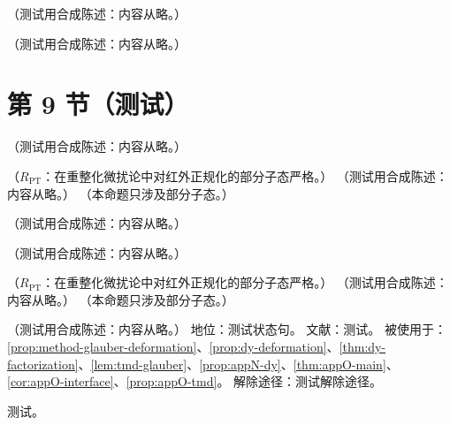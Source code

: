 \begin{remark}\label{rem:appO-weak}
（测试用合成陈述：内容从略。）
\end{remark}

\begin{remark}[H-发射端点的障碍]\label{rem:appO-h-emission}
（测试用合成陈述：内容从略。）
\end{remark}

\section{第 9 节（测试）}\label{sec:appO-main}

\begin{definition}\label{def:appO-deformation-map}
（测试用合成陈述：内容从略。）
\end{definition}

\begin{lemma}\label{lem:appO-no-crossing}
（$R_{\mathrm{PT}}$：在重整化微扰论中对红外正规化的部分子态严格。）
（测试用合成陈述：内容从略。）
（本命题只涉及部分子态。）
\end{lemma}

\begin{definition}[分级构型]\label{def:appO-graded}
（测试用合成陈述：内容从略。）
\end{definition}

\begin{definition}[形变目标与相容性]\label{def:appO-target}
（测试用合成陈述：内容从略。）
\end{definition}

\begin{proposition}\label{prop:appO-target}
（$R_{\mathrm{PT}}$：在重整化微扰论中对红外正规化的部分子态严格。）
（测试用合成陈述：内容从略。）
（本命题只涉及部分子态。）
\end{proposition}

\begin{assumption}\label{asm:appO-deformation}
（测试用合成陈述：内容从略。）
地位：测试状态句。
文献：测试。
被使用于：\cref{prop:method-glauber-deformation}、\cref{prop:dy-deformation}、\cref{thm:dy-factorization}、\cref{lem:tmd-glauber}、\cref{prop:appN-dy}、\cref{thm:appO-main}、\cref{cor:appO-interface}、\cref{prop:appO-tmd}。
解除途径：测试解除途径。
\end{assumption}
\begin{proofsketch}测试。\end{proofsketch}

